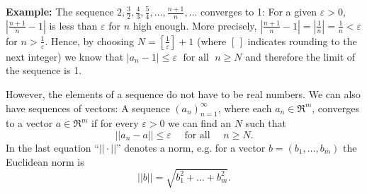 \documentclass[a4paper,12pt]{article}
\theoremstyle{plain}
\begin{document}
\textbf{Example: }
  The sequence $2,\frac{3}{2},\frac{4}{3},\frac{5}{4},\dots,\frac{n+1}{n},\dots$ converges to 1: For a given $\varepsilon >0$, $\left|\frac{n+1}{n}-1\right|$ is less than $\varepsilon $ for $n$ high enough. More precisely, $\left|\frac{n+1}{n}-1\right|=\left|\frac{1}{n}\right|=\frac{1}{n}<\varepsilon $ for $n>\frac{1}{\varepsilon }$. Hence, by choosing $N=\left[\frac{1}{\varepsilon }\right]+1$ (where $[\,]$ indicates rounding to the next integer) we know that $|a_n-1|\leq\varepsilon \;\text{ for all }\; n\geq N$ and therefore the limit of the sequence is 1. 

However, the elements of a sequence do not have to be real numbers. We can also have sequences of vectors: A sequence $(a_n)_{n=1}^\infty$, where each $a_n\in \Re^m$, converges to a vector $a\in \Re^m$ if for every $\varepsilon >0$ we can find an $N$ such that 
\begin{equation}
  \label{eq:2}
  ||a_n-a||\leq\varepsilon \quad\text{ for all }\quad n\geq N.
\end{equation}
In the last equation ``$||\cdot||$'' denotes a norm, e.g. for a vector $b=(b_1,\dots,b_m)$ the Euclidean norm is 
\begin{equation}
  \label{eq:3}
  ||b||=\sqrt{b_1^2+\dots+b_m^2}.
\end{equation}
\end{document}
